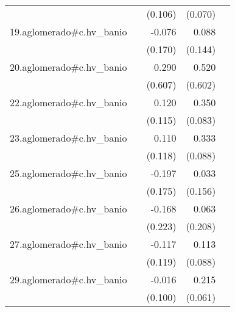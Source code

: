 {\begin{longtable}{l*{4}{D{.}{.}{-1}}}
            &                     &     (0.106)         &     (0.070)         &                     \\
\addlinespace
19.aglomerado#c.hv\_banio&                     &      -0.076         &       0.088         &                     \\
            &                     &     (0.170)         &     (0.144)         &                     \\
\addlinespace
20.aglomerado#c.hv\_banio&                     &       0.290         &       0.520         &                     \\
            &                     &     (0.607)         &     (0.602)         &                     \\
\addlinespace
22.aglomerado#c.hv\_banio&                     &       0.120         &       0.350\sym{***}&                     \\
            &                     &     (0.115)         &     (0.083)         &                     \\
\addlinespace
23.aglomerado#c.hv\_banio&                     &       0.110         &       0.333\sym{***}&                     \\
            &                     &     (0.118)         &     (0.088)         &                     \\
\addlinespace
25.aglomerado#c.hv\_banio&                     &      -0.197         &       0.033         &                     \\
            &                     &     (0.175)         &     (0.156)         &                     \\
\addlinespace
26.aglomerado#c.hv\_banio&                     &      -0.168         &       0.063         &                     \\
            &                     &     (0.223)         &     (0.208)         &                     \\
\addlinespace
27.aglomerado#c.hv\_banio&                     &      -0.117         &       0.113         &                     \\
            &                     &     (0.119)         &     (0.088)         &                     \\
\addlinespace
29.aglomerado#c.hv\_banio&                     &      -0.016         &       0.215\sym{***}&                     \\
            &                     &     (0.100)         &     (0.061)         &                     \\

\end{longtable}}
